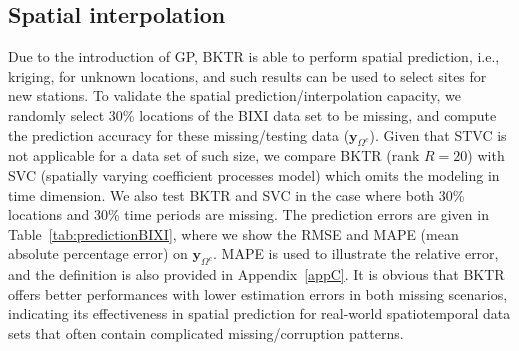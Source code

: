 \documentclass[12pt]{article}
\begin{document}
\subsection{Spatial interpolation}

Due to the introduction of GP, BKTR is able to perform spatial prediction, i.e., kriging, for unknown locations, and such results can be used to select sites for new stations. To validate the spatial prediction/interpolation capacity, we randomly select 30\% locations of the BIXI data set to be missing, and compute the prediction accuracy for these missing/testing data ($\boldsymbol{y}_{\Omega^c}$). Given that STVC is not applicable for a data set of such size, we compare BKTR (rank $R=20$) with SVC (spatially varying coefficient processes model) \citep{gelfand2003spatial} which omits the modeling in time dimension. We also test BKTR and SVC in the case where both 30\% locations and 30\% time periods are missing. The prediction errors are given in Table~\ref{tab:predictionBIXI}, where we show the RMSE and MAPE (mean absolute percentage error) on $\boldsymbol{y}_{\Omega^c}$. MAPE is used to illustrate the relative error, and the definition is also provided in Appendix~\ref{appC}. It is obvious that BKTR offers better performances with lower estimation errors in both missing scenarios, indicating its effectiveness in spatial prediction for real-world spatiotemporal data sets that often contain complicated missing/corruption patterns.



\end{document}
